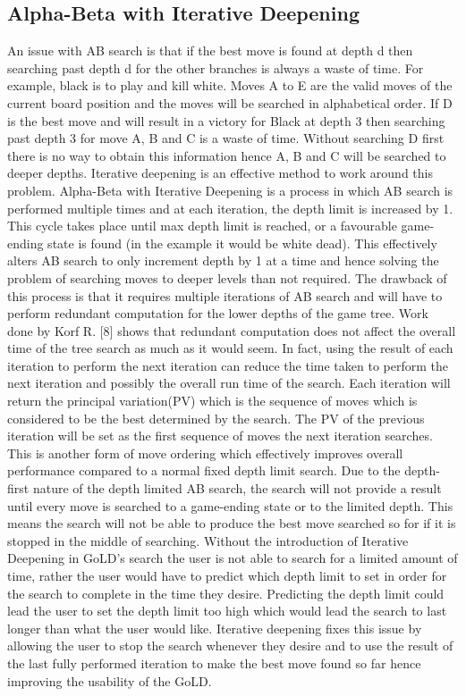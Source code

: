 \documentclass{l4proj}
\begin{document}
\subsection{Alpha-Beta with Iterative Deepening}
An issue with AB search is that if the best move is found at depth d then searching past depth d for the other branches is always a waste of time. For example,  black is to play and kill white. Moves A to E are the valid moves of the current board position and the moves will be searched in alphabetical order. If D is the best move and will result in a victory for Black at depth 3 then searching past depth 3 for move A, B and C is a waste of time. Without searching D first there is no way to obtain this information hence A, B and C will be searched to deeper depths. Iterative deepening is an effective method to work around this problem. Alpha-Beta with Iterative Deepening is a process in which AB search is performed multiple times and at each iteration, the depth limit is increased by 1. This cycle takes place until max depth limit is reached, or a favourable game-ending state is found  (in the example it would be white dead). This effectively alters AB search to only increment depth by 1 at a time and hence solving the problem of searching moves to deeper levels than not required.
The drawback of this process is that it requires multiple iterations of AB search and will have to perform redundant computation for the lower depths of the game tree. Work done by Korf R. [8] shows that redundant computation does not affect the overall time of the tree search as much as it would seem. In fact, using the result of each iteration to perform the next iteration can reduce the time taken to perform the next iteration and possibly the overall run time of the search. Each iteration will return the principal variation(PV) which is the sequence of moves which is considered to be the best determined by the search. The PV of the previous iteration will be set as the first sequence of moves the next iteration searches. This is another form of move ordering which effectively improves overall performance compared to a normal fixed depth limit search.
Due to the depth-first nature of the depth limited AB search, the search will not provide a result until every move is searched to a game-ending state or to the limited depth. This means the search will not be able to produce the best move searched so for if it is stopped in the middle of searching. Without the introduction of Iterative Deepening in GoLD’s search the user is not able to search for a limited amount of time, rather the user would have to predict which depth limit to set in order for the search to complete in the time they desire.  Predicting the depth limit could lead the user to set the depth limit too high which would lead the search to last longer than what the user would like. Iterative deepening fixes this issue by allowing the user to stop the search whenever they desire and to use the result of the last fully performed iteration to make the best move found so far hence improving the usability of the GoLD.
\end{document}
